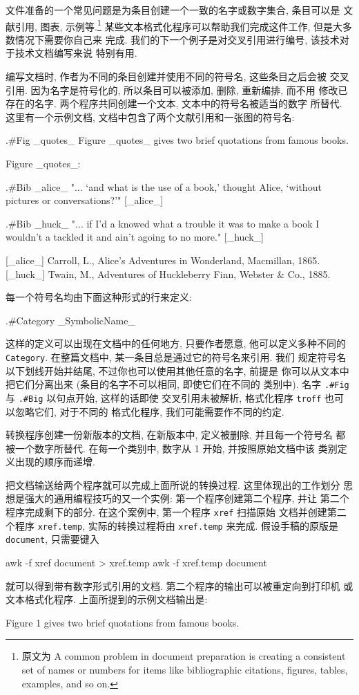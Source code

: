 {文件准备的一个常见问题是为条目创建一个一致的名字或数字集合, 条目可以是
文献引用, 图表, 示例等.\footnote{原文为 A common problem in document
    preparation is creating a consistent set of names or numbers for items
like bibliographic citations, figures, tables, examples, and so on.}
某些文本格式化程序可以帮助我们完成这件工作, 但是大多数情况下需要你自己来
完成. 我们的下一个例子是对交叉引用进行编号, 该技术对于技术文档编写来说
特别有用.

编写文档时, 作者为不同的条目创建并使用不同的符号名, 这些条目之后会被
交叉引用. 因为名字是符号化的, 所以条目可以被添加, 删除, 重新编排, 而不用
修改已存在的名字. 两个程序共同创建一个文本, 文本中的符号名被适当的数字
所替代. 这里有一个示例文档, 文档中包含了两个文献引用和一张图的符号名:
\begin{file}
    .#Fig _quotes_
    Figure _quotes_ gives two brief quotations from famous books.

                            Figure _quotes_:

    .#Bib _alice_
      "... `and what is the use of a book,' thought Alice,
      `without pictures or conversations?'" [_alice_]

    .#Bib _huck_
      "... if I'd a knowed what a trouble it was to make a book
      I wouldn't a tackled it and ain't agoing to no more." [_huck_]


    [_alice_] Carroll, L., Alice's Adventures in Wonderland,
        Macmillan, 1865.
    [_huck_] Twain, M., Adventures of Huckleberry Finn,
        Webster & Co., 1885.
\end{file}
每一个符号名均由下面这种形式的行来定义:
\begin{file}
    .#Category _SymbolicName_
\end{file}
这样的定义可以出现在文档中的任何地方, 只要作者愿意, 他可以定义多种不同的
\texttt{Category}. 在整篇文档中, 某一条目总是通过它的符号名来引用. 我们 
规定符号名以下划线开始并结尾, 不过你也可以使用其他任意的名字, 前提是
你可以从文本中把它们分离出来 (条目的名字不可以相同, 即使它们在不同的
类别中). 名字 \texttt{.#Fig} 与 \texttt{.#Big} 以句点开始, 这样的话即使
交叉引用未被解析, 格式化程序 \texttt{troff} 也可以忽略它们, 对于不同的
格式化程序, 我们可能需要作不同的约定.

转换程序创建一份新版本的文档, 在新版本中, 定义被删除, 并且每一个符号名
都被一个数字所替代. 在每一个类别中, 数字从 1 开始, 并按照原始文档中该
类别定义出现的顺序而递增. 

把文档输送给两个程序就可以完成上面所说的转换过程. 这里体现出的工作划分
思想是强大的通用编程技巧的又一个实例: 第一个程序创建第二个程序, 并让
第二个程序完成剩下的部分. 在这个案例中, 第一个程序 \texttt{xref} 扫描原始
文档并创建第二个程序 \texttt{xref.temp}, 实际的转换过程将由
\texttt{xref.temp} 来完成. 假设手稿的原版是 \texttt{document}, 只需要键入
\begin{shell}
    awk -f xref document > xref.temp
    awk -f xref.temp document
\end{shell}
就可以得到带有数字形式引用的文档. 第二个程序的输出可以被重定向到打印机
或文本格式化程序.
上面所提到的示例文档输出是:
\begin{file}
    Figure 1 gives two brief quotations from famous books.


\end{file}}
